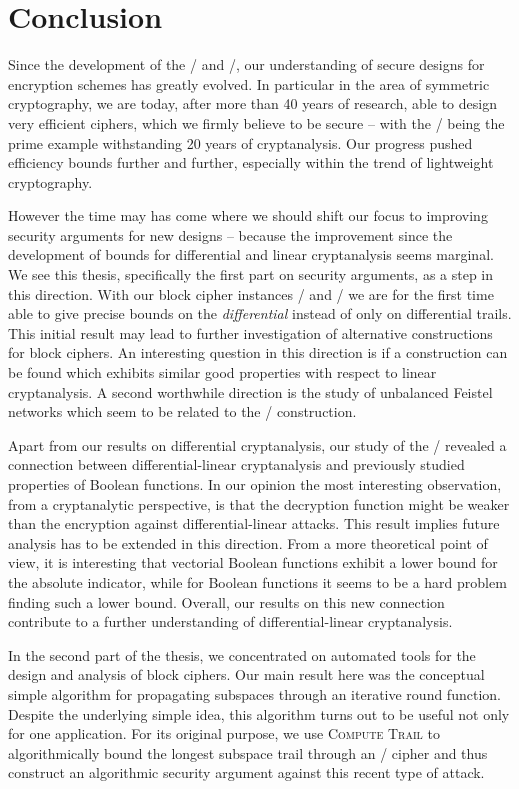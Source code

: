 \chapter{Conclusion}\label{ch:conclusion}
Since the development of the \DES/ and \AES/, our understanding of secure designs for encryption schemes has greatly evolved.
In particular in the area of symmetric cryptography, we are today, after more than 40 years of research, able to design very efficient ciphers, which we firmly believe to be secure -- with the \AES/ being the prime example withstanding 20 years of cryptanalysis.
Our progress pushed efficiency bounds further and further, especially within the trend of lightweight cryptography.

However the time may has come where we should shift our focus to improving security arguments for new designs -- because the improvement since the development of bounds for differential and linear cryptanalysis seems marginal.
We see this thesis, specifically the first part on security arguments, as a step in this direction.
With our block cipher instances \bison/ and \wisent/ we are for the first time able to give precise bounds on the \emph{differential} instead of only on differential trails.
This initial result may lead to further investigation of alternative constructions for block ciphers.
An interesting question in this direction is if a construction can be found which exhibits similar good properties with respect to linear cryptanalysis.
A second worthwhile direction is the study of unbalanced Feistel networks which seem to be related to the \WSN/ construction.

Apart from our results on differential cryptanalysis, our study of the \ACT/ revealed a connection between differential-linear cryptanalysis and previously studied properties of Boolean functions.
In our opinion the most interesting observation, from a cryptanalytic perspective, is that the decryption function might be weaker than the encryption against differential-linear attacks.
This result implies future analysis has to be extended in this direction.
From a more theoretical point of view, it is interesting that vectorial Boolean functions exhibit a lower bound for the absolute indicator, while for Boolean functions it seems to be a hard problem finding such a lower bound.
Overall, our results on this new connection contribute to a further understanding of differential-linear cryptanalysis.

In the second part of the thesis, we concentrated on automated tools for the design and analysis of block ciphers.
Our main result here was the conceptual simple algorithm for propagating subspaces through an iterative round function.
Despite the underlying simple idea, this algorithm turns out to be useful not only for one application.
For its original purpose, we use \textsc{Compute Trail} to algorithmically bound the longest subspace trail through an \SPN/ cipher and thus construct an algorithmic security argument against this recent type of attack.

